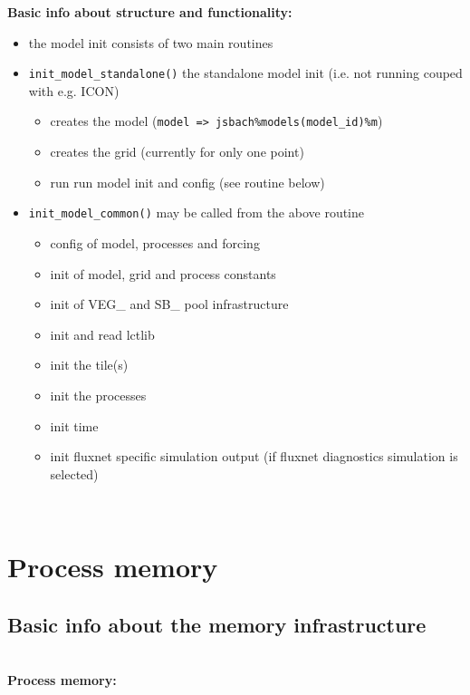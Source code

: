 \textbf{Basic info about structure and functionality:}
\begin{itemize}
\item the model init consists of two main routines
\item \texttt{init\_model\_standalone()} the standalone model init (i.e. not running couped with e.g. ICON)
\begin{itemize}
	\item creates the model (\texttt{model => jsbach\%models(model\_id)\%m})
	\item creates the grid (currently for only one point)
	\item run run model init and config (see routine below)
\end{itemize}
\item \texttt{init\_model\_common()} may be called from the above routine
\begin{itemize}
	\item config of model, processes and forcing
	\item init of model, grid and process constants
	\item init of VEG\_ and SB\_ pool infrastructure
	\item init and read lctlib
	\item init the tile(s)
	\item init the processes
	\item init time
	\item init fluxnet specific simulation output (if fluxnet diagnostics simulation is selected)
\end{itemize}
\end{itemize}
~\\


\newpage
\section{Process memory}\label{sec:memory_structure_usage}

\subsection{Basic info about the memory infrastructure}\label{subsec:basic_memory_structure}
~\\

\textbf{Process memory:}

